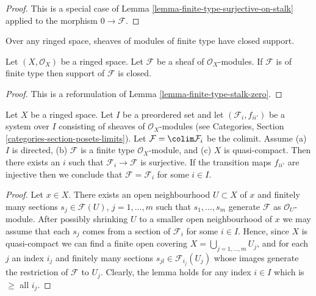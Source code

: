 \begin{proof}
This is a special case of
Lemma \ref{lemma-finite-type-surjective-on-stalk}
applied to the morphism $0 \to \mathcal{F}$.
\end{proof}

\begin{lemma}
\label{lemma-support-finite-type-closed}
\begin{slogan}
Over any ringed space, sheaves of modules of finite type have closed support.
\end{slogan}
Let $(X, \mathcal{O}_X)$ be a ringed space.
Let $\mathcal{F}$ be a sheaf of $\mathcal{O}_X$-modules.
If $\mathcal{F}$ is of finite type then support of $\mathcal{F}$ is closed.
\end{lemma}

\begin{proof}
This is a reformulation of Lemma \ref{lemma-finite-type-stalk-zero}.
\end{proof}

\begin{lemma}
\label{lemma-finite-type-quasi-compact-colimit}
Let $X$ be a ringed space. Let $I$ be a preordered set and
let $(\mathcal{F}_i, f_{ii'})$ be a system over $I$ consisting of sheaves
of $\mathcal{O}_X$-modules (see
Categories, Section \ref{categories-section-posets-limits}).
Let $\mathcal{F} = \colim \mathcal{F}_i$ be the colimit. Assume
(a) $I$ is directed,
(b) $\mathcal{F}$ is a finite type $\mathcal{O}_X$-module, and
(c) $X$ is quasi-compact. Then there exists an $i$ such that
$\mathcal{F}_i \to \mathcal{F}$ is surjective.
If the transition maps $f_{ii'}$ are injective
then we conclude that $\mathcal{F} = \mathcal{F}_i$ for some $i \in I$.
\end{lemma}

\begin{proof}
Let $x \in X$. There exists an open neighbourhood
$U \subset X$ of $x$ and finitely many sections
$s_j \in \mathcal{F}(U)$, $j = 1, \ldots, m$ such that
$s_1, \ldots, s_m$ generate $\mathcal{F}$ as $\mathcal{O}_U$-module.
After possibly shrinking $U$ to a smaller open neighbourhood of $x$
we may assume that each $s_j$ comes from a section of $\mathcal{F}_i$
for some $i \in I$.
Hence, since $X$ is quasi-compact we can find a finite open
covering $X = \bigcup_{j = 1, \ldots, m} U_j$, and for each $j$
an index $i_j$ and finitely many sections $s_{jl} \in \mathcal{F}_{i_j}(U_j)$
whose images generate the restriction of $\mathcal{F}$ to
$U_j$. Clearly, the lemma holds for any index $i \in I$ which
is $\geq$ all $i_j$.
\end{proof}

